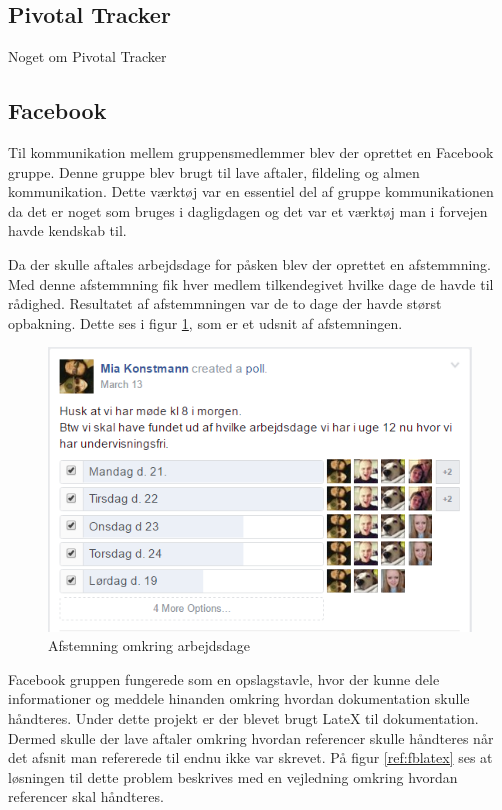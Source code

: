 \subsection{Pivotal Tracker}
Noget om Pivotal Tracker

\subsection{Facebook}
Til kommunikation mellem gruppensmedlemmer blev der oprettet en Facebook gruppe. Denne gruppe blev brugt til lave aftaler, fildeling og almen kommunikation. Dette værktøj var en essentiel del af gruppe kommunikationen da det er noget som bruges i dagligdagen og det var et værktøj man i forvejen havde kendskab til. \newline

Da der skulle aftales arbejdsdage for påsken blev der oprettet en afstemmning. Med denne afstemmning fik hver medlem tilkendegivet hvilke dage de havde til rådighed. Resultatet af afstemmningen var de to dage der havde størst opbakning. Dette ses i figur \ref{ref:fbpoll}, som er et udsnit af afstemningen.
\begin{figure}[H]
	\centering
	\includegraphics[scale=0.6]{Projektgennemfoerelse/images/fbpoll}
	\caption{Afstemning omkring arbejdsdage}
	\label{ref:fbpoll}
\end{figure}

Facebook gruppen fungerede som en opslagstavle, hvor der kunne dele informationer og meddele hinanden omkring hvordan dokumentation skulle håndteres. Under dette projekt er der blevet brugt LateX til dokumentation. Dermed skulle der lave aftaler omkring hvordan referencer skulle håndteres når det afsnit man refererede til endnu ikke var skrevet. På figur \ref{ref:fblatex} ses at løsningen til dette problem beskrives med en vejledning omkring hvordan referencer skal håndteres.

